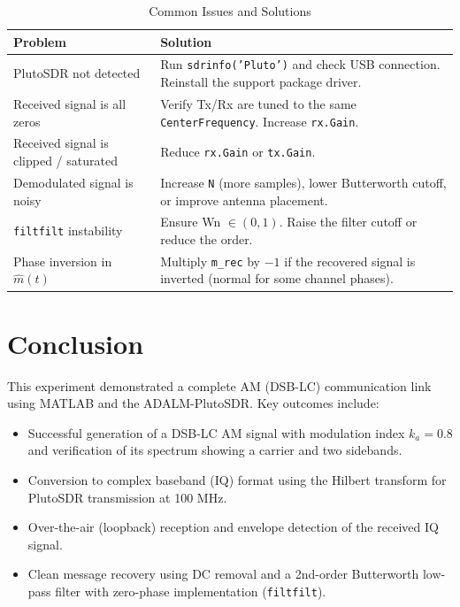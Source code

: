 \documentclass[12pt,a4paper]{article}
\begin{document}
\begin{table}[H]
  \centering
  \caption{Common Issues and Solutions}
  \begin{tabular}{p{4.5cm} p{8.5cm}}
    \toprule
    \textbf{Problem} & \textbf{Solution} \\
    \midrule
    PlutoSDR not detected &
      Run \texttt{sdrinfo('Pluto')} and check USB connection.
      Reinstall the support package driver. \\[4pt]
    Received signal is all zeros &
      Verify Tx/Rx are tuned to the same \texttt{CenterFrequency}.
      Increase \texttt{rx.Gain}. \\[4pt]
    Received signal is clipped / saturated &
      Reduce \texttt{rx.Gain} or \texttt{tx.Gain}. \\[4pt]
    Demodulated signal is noisy &
      Increase \texttt{N} (more samples), lower Butterworth cutoff, or
      improve antenna placement. \\[4pt]
    \texttt{filtfilt} instability & 
      Ensure Wn $\in (0,1)$. Raise the filter cutoff or reduce the order. \\[4pt]
    Phase inversion in $\hat{m}(t)$ &
      Multiply \texttt{m\_rec} by $-1$ if the recovered signal is inverted
      (normal for some channel phases). \\
    \bottomrule
  \end{tabular}
\end{table}

\section{Conclusion}

This experiment demonstrated a complete AM (DSB-LC) communication link using
MATLAB and the ADALM-PlutoSDR.  Key outcomes include:

\begin{itemize}
  \item Successful generation of a DSB-LC AM signal with modulation index
        $k_a = 0.8$ and verification of its spectrum showing a carrier and two
        sidebands.
  \item Conversion to complex baseband (IQ) format using the Hilbert transform
        for PlutoSDR transmission at 100 MHz.
  \item Over-the-air (loopback) reception and envelope detection
        of the received IQ signal.
  \item Clean message recovery using DC removal and a 2nd-order Butterworth
        low-pass filter with zero-phase implementation (\texttt{filtfilt}).
\end{itemize}
\end{document}
